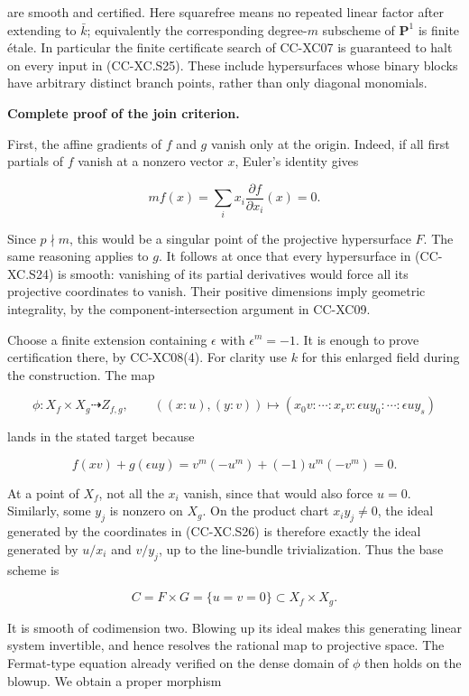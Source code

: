 are smooth and certified. Here squarefree means no repeated linear
factor after extending to \(\bar k\); equivalently the corresponding
degree-\(m\) subscheme of \(\mathbf P^1\) is finite étale. In particular
the finite certificate search of CC-XC07 is guaranteed to halt on every
input in (CC-XC.S25). These include hypersurfaces whose binary blocks
have arbitrary distinct branch points, rather than only diagonal
monomials.

\textbf{Complete proof of the join criterion.}

First, the affine gradients of \(f\) and \(g\) vanish only at the
origin. Indeed, if all first partials of \(f\) vanish at a nonzero
vector \(x\), Euler's identity gives

\[
 m f(x)=\sum_i x_i\frac{\partial f}{\partial x_i}(x)=0.
\]

Since \(p\nmid m\), this would be a singular point of the projective
hypersurface \(F\). The same reasoning applies to \(g\). It follows at
once that every hypersurface in (CC-XC.S24) is smooth: vanishing of its
partial derivatives would force all its projective coordinates to
vanish. Their positive dimensions imply geometric integrality, by the
component-intersection argument in CC-XC09.

Choose a finite extension containing \(\epsilon\) with
\(\epsilon^m=-1\). It is enough to prove certification there, by
CC-XC08(4). For clarity use \(k\) for this enlarged field during the
construction. The map

\[
 \phi:X_f\times X_g\dashrightarrow Z_{f,g},\qquad
 ((x:u),(y:v))\longmapsto(x_0v:\cdots:x_rv:
                              \epsilon u y_0:\cdots:\epsilon u y_s)
 \tag{CC-XC.S26}
\]

lands in the stated target because

\[
 f(xv)+g(\epsilon uy)
 =v^m(-u^m)+(-1)u^m(-v^m)=0.
\]

At a point of \(X_f\), not all the \(x_i\) vanish, since that would also
force \(u=0\). Similarly, some \(y_j\) is nonzero on \(X_g\). On the
product chart \(x_i y_j\ne0\), the ideal generated by the coordinates in
(CC-XC.S26) is therefore exactly the ideal generated by \(u/x_i\) and
\(v/y_j\), up to the line-bundle trivialization. Thus the base scheme is

\[
 C=F\times G=\{u=v=0\}\subset X_f\times X_g.
\]

It is smooth of codimension two. Blowing up its ideal makes this
generating linear system invertible, and hence resolves the rational map
to projective space. The Fermat-type equation already verified on the
dense domain of \(\phi\) then holds on the blowup. We obtain a proper
morphism

